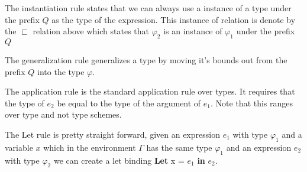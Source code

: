 \begin{prooftree}
\end{prooftree}

The instantiation rule states that we can always use a instance of a type under the prefix $Q$ as the type of the expression. This instance of relation is denote by the $\sqsubset$ relation above which states that $\varphi_2$ is an instance of $\varphi_1$ under the prefix $Q$

\begin{prooftree}
\end{prooftree}

The generalization rule generalizes a type by moving it's bounds out from the prefix $Q$ into the type $\varphi$.

\begin{prooftree}
\end{prooftree}

The application rule is the standard application rule over types. It requires that the type of $e_2$ be equal to the type of the argument of $e_1$. Note that this ranges over type and not type schemes.

\begin{prooftree}
\end{prooftree}

The Let rule is pretty straight forward, given an expression $e_1$ with type $\varphi_1$ and a variable $x$ which in the environment $\Gamma$ has the same type $\varphi_1$ and an expression $e_2$ with type $\varphi_2$ we can create a let binding \textbf{Let} x = $e_1$ \textbf{in} $e_2$.

